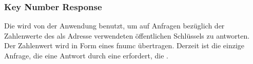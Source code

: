 \asprotokeyencblocksizereqbytefield


\subsubsection{Key Number Response}
\label{dcl-asproto-keynum}
Die \msg{\asprotokeynum} wird von der Anwendung benutzt, um auf Anfragen
bezüglich der Zahlenwerte des als Adresse verwendeten öffentlichen Schlüssels zu
antworten.
Der Zahlenwert wird in Form eines \gls{fnumc} übertragen.
Derzeit ist die einzige Anfrage, die eine Antwort durch eine
\msg{\asprotokeynum} erfordert, die \msg{\asprotokeyencblocksizereq}.

\asprotokeynumbytefield
